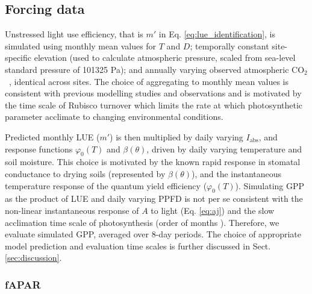 \documentclass{myreport}
\newcommand{\coo}{CO$_2$}
\begin{document}

\subsection{Forcing data}
\label{sec:forcingdata}

Unstressed light use efficiency, that is $m'$ in Eq. \ref{eq:lue_identification}, is simulated using monthly mean values for $T$ and $D$; temporally constant site-specific elevation (used to calculate atmospheric pressure, scaled from sea-level standard pressure of 101325 Pa); and annually varying observed atmospheric \coo\ \citep{MacFarlingMeure2006}, identical across sites. The choice of aggregating to monthly mean values is consistent with previous modelling studies \citet{maire12po} and observations \citep{suzuki01} and is motivated by the time scale of Rubisco turnover which limits the rate at which photosynthetic parameter acclimate to changing environmental conditions.

Predicted monthly LUE ($m'$) is then multiplied by daily varying $I_\text{abs}$, and response functions $\varphi_0(T)$ and $\beta(\theta)$, driven by daily varying temperature and soil moisture. This choice is motivated by the known rapid response in stomatal conductance to drying soils (represented by $\beta(\theta)$), and the instantaneous temperature response of the quantum yield efficiency ($\varphi_0(T)$). Simulating GPP as the product of LUE and daily varying PPFD is not per se consistent with the non-linear instantaneous response of $A$ to light (Eq. \ref{eq:aj}) and the slow acclimation time scale of photosynthesis (order of months \citep{suzuki01, maire12po}). Therefore, we evaluate simulated GPP, averaged over 8-day periods. The choice of appropriate model prediction and evaluation time scales is further discussed in Sect. \ref{sec:discussion}.  

\subsubsection{fAPAR}
\label{sec:greennessdata}
\end{document}
